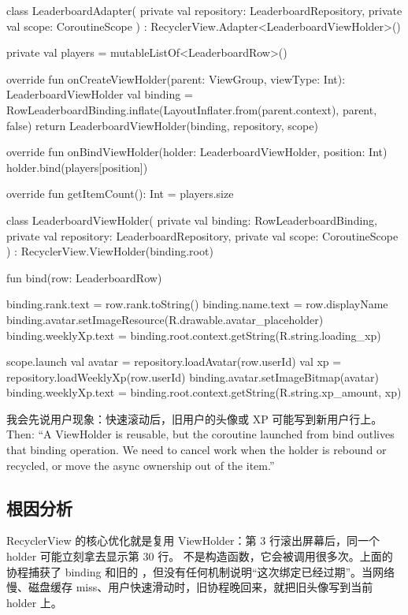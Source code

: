 \begin{ktbug}
class LeaderboardAdapter(
    private val repository: LeaderboardRepository,
    private val scope: CoroutineScope
) : RecyclerView.Adapter<LeaderboardViewHolder>() {
    private val players = mutableListOf<LeaderboardRow>()

    override fun onCreateViewHolder(parent: ViewGroup, viewType: Int): LeaderboardViewHolder {
        val binding = RowLeaderboardBinding.inflate(LayoutInflater.from(parent.context), parent, false)
        return LeaderboardViewHolder(binding, repository, scope)
    }

    override fun onBindViewHolder(holder: LeaderboardViewHolder, position: Int) {
        holder.bind(players[position])
    }

    override fun getItemCount(): Int = players.size
}

class LeaderboardViewHolder(
    private val binding: RowLeaderboardBinding,
    private val repository: LeaderboardRepository,
    private val scope: CoroutineScope
) : RecyclerView.ViewHolder(binding.root) {

    fun bind(row: LeaderboardRow) {
        binding.rank.text = row.rank.toString()
        binding.name.text = row.displayName
        binding.avatar.setImageResource(R.drawable.avatar_placeholder)
        binding.weeklyXp.text = binding.root.context.getString(R.string.loading_xp)

        scope.launch {
            val avatar = repository.loadAvatar(row.userId)
            val xp = repository.loadWeeklyXp(row.userId)
            binding.avatar.setImageBitmap(avatar)
            binding.weeklyXp.text = binding.root.context.getString(R.string.xp_amount, xp)
        }
    }
}
\end{ktbug}

\begin{sayit}[面试里怎么说]
我会先说用户现象：快速滚动后，旧用户的头像或 XP 可能写到新用户行上。Then: ``A ViewHolder is reusable, but the coroutine launched from bind outlives that binding operation. We need to cancel work when the holder is rebound or recycled, or move the async ownership out of the item.''
\end{sayit}

\subsection*{根因分析}
RecyclerView 的核心优化就是复用 ViewHolder：第 3 行滚出屏幕后，同一个 holder 可能立刻拿去显示第 30 行。 不是构造函数，它会被调用很多次。上面的协程捕获了 binding 和旧的 ，但没有任何机制说明“这次绑定已经过期”。当网络慢、磁盘缓存 miss、用户快速滑动时，旧协程晚回来，就把旧头像写到当前 holder 上。

